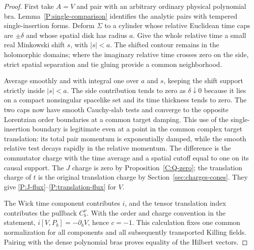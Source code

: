 \begin{proof}
First take $A=V$ and pair with an arbitrary ordinary physical
polynomial bra.  Lemma~\ref{P:single-comparison} identifies the
analytic pairs with tempered single-insertion forms.  Deform
$\Sigma$ to a cylinder whose relative Euclidean time caps are
$\pm\delta$ and whose spatial disk has radius $a$.  Give the whole
relative time a small real Minkowski shift $s$, with $|s|<a$.
The shifted contour remains in the holomorphic domains; where the
imaginary relative time crosses zero on the side, strict spatial
separation and tie gluing provide a common neighborhood.

Average smoothly and with integral one over $a$ and $s$, keeping the
shift support strictly inside $|s|<a$.  The side contribution tends to
zero as $\delta\downarrow0$ because it lies on a compact nonsingular
spacelike set and its time thickness tends to zero.  The two caps now
have smooth Cauchy-slab tests and converge to the opposite Lorentzian
order boundaries at a common target damping.  This use of the
single-insertion boundary is legitimate even at a point in the common
complex target translation: its total pair momentum is exponentially
damped, while the smooth relative test decays rapidly in the relative
momentum.  The difference is the commutator charge with the time
average and a spatial cutoff equal to one on its causal support.
The $J$ charge is zero by Proposition~\ref{C:Q-zero}; the translation
charge of $t$ is the original translation charge by
Section~\ref{sec:charges-cones}.  They give
\eqref{P:J-flux}--\eqref{P:translation-flux} for $V$.

The Wick time component contributes $i$, and the tensor translation
index contributes the pullback $C_b^\nu$.  With the order and charge
convention in the statement,
$i[V,P_b]=-\partial_bV$, hence $c=-1$.  This calculation fixes one
common normalization for all components and all subsequently
transported Killing fields.  Pairing with the dense polynomial bras
proves equality of the Hilbert vectors.


\end{proof}
